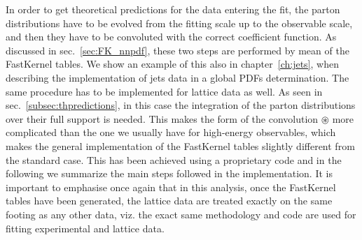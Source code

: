 In order to get theoretical predictions for the data entering the fit, 
the parton distributions have to be evolved from the fitting scale up to the observable scale, and then
they have to be convoluted with the correct coefficient function. 
As discussed in sec.~\ref{sec:FK_nnpdf}, these two steps are performed by mean of the FastKernel tables.
We show an example of this also in chapter~\ref{ch:jets}, when describing the implementation of jets
data in a global PDFs determination.
%
The same procedure has to be implemented for lattice data as well.
As seen in sec.~\ref{subsec:thpredictions}, in this case the
integration of the parton distributions over their full support is needed. This
makes the form of the convolution $\circledast$ more complicated than the one we
usually have for high-energy observables, which makes the general implementation of 
the FastKernel tables slightly different from the standard case.
This has been achieved using a proprietary code and in the following we summarize the main steps followed in 
the implementation.
It is important to emphasise once again that in this analysis, once the FastKernel tables have been generated, 
the lattice data are treated exactly on the same footing as any other data, viz. the exact same methodology 
and code are used for fitting experimental and lattice data.

